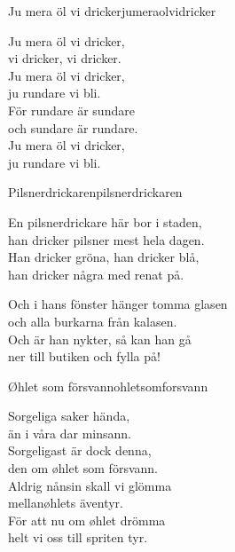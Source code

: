 \newpage

\begin{song}{Ju mera öl vi dricker}{jumeraolvidricker}
\begin{vers}
Ju mera öl vi dricker,\\
vi dricker, vi dricker.\\
Ju mera öl vi dricker,\\
ju rundare vi bli.\\
För rundare är sundare\\
och sundare är rundare.\\
Ju mera öl vi dricker,\\
ju rundare vi bli.\\
\end{vers}
\end{song}

\begin{song}{Pilsnerdrickaren}{pilsnerdrickaren}
\begin{vers}
En pilsnerdrickare här bor i staden,\\
han dricker pilsner mest hela dagen.\\
Han dricker gröna, han dricker blå,\\
han dricker några med renat på.\\
\end{vers}
\begin{vers}
Och i hans fönster hänger tomma glasen\\
och alla burkarna från kalasen.\\
Och är han nykter, så kan han gå\\
ner till butiken och fylla på!\\
\end{vers}
\end{song}

\newpage

\begin{song}{Øhlet som försvann}{ohletsomforsvann}
\begin{vers}
Sorgeliga saker hända,\\
än i våra dar minsann.\\
Sorgeligast är dock denna,\\
den om øhlet som försvann.\\
Aldrig nånsin skall vi glömma\\
mellanøhlets äventyr.\\
För att nu om øhlet drömma\\
helt vi oss till spriten tyr.\\
\end{vers}
\end{song}

